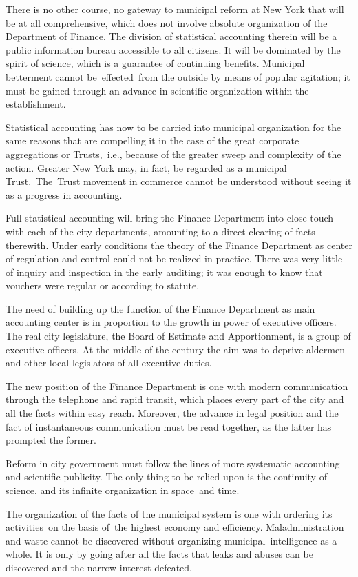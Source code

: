 \documentclass[twoside,symmetric,nobib,justified]{tufte-book}
\begin{document}
There is no other course, no gateway to municipal reform at New York
that will be at all comprehensive, which does not involve absolute
organization of the Department of Finance. The division of statistical
accounting therein will be a public information bureau accessible to all
citizens. It will be dominated by the spirit of science, which is a
guarantee of continuing benefits. Municipal betterment cannot
be~effected~from the outside by means of popular agitation; it must be
gained through an advance in scientific organization within the
establishment.~

Statistical accounting has now to be carried into municipal organization
for the same reasons that are compelling it in the case of the great
corporate aggregations or Trusts,~i.e., because of the greater sweep and
complexity of the action. Greater New York may, in fact, be regarded as
a municipal Trust.~The~Trust movement in commerce cannot be understood
without seeing it as a progress in accounting.~

Full statistical accounting will bring the Finance Department into close
touch with each of the city departments, amounting to a direct clearing
of facts therewith. Under early conditions the theory of the Finance
Department as center of regulation and control could not be realized in
practice. There was very little of inquiry and inspection in the early
auditing; it was enough to know that vouchers were regular or according
to statute.~

The need of building up the function of the Finance Department as main
accounting center is in proportion to the growth in power of executive
officers. The real city legislature, the Board of Estimate and
Apportionment, is a group of executive officers. At the middle of the
century the aim was to deprive aldermen and other local legislators of
all executive duties.~

The new position of the Finance Department is one with modern
communication through the telephone and rapid transit, which places
every part of the city and all the facts within easy reach. Moreover,
the advance in legal position and the fact of instantaneous
communication must be read together, as the latter has prompted the
former.~~

Reform in city government must follow the lines of more systematic
accounting and scientific publicity. The only thing to be relied upon is
the continuity of science, and its infinite organization in space~and
time.~

The organization of the facts of the municipal system is one with
ordering its activities~on the basis of~the highest economy and
efficiency. Maladministration and waste cannot be discovered without
organizing municipal~intelligence as a whole. It is only by going after
all the facts that leaks and abuses can be discovered and the narrow
interest defeated.~
\end{document}
